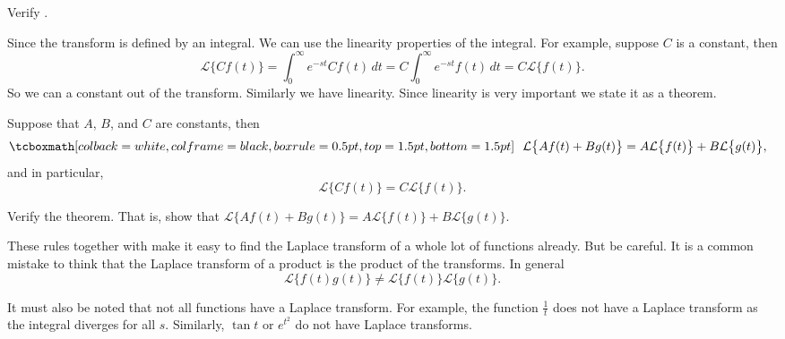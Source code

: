 \begin{exercise}
Verify .
\end{exercise}

Since the transform is defined by an integral.  We can use the linearity
properties of the integral.  For example, suppose $C$ is a constant, then
\begin{equation*}
\mathcal{L} \bigl\{ C f(t) \bigr\} =
\int_0^\infty e^{-st} C f(t) \,dt =
C \int_0^\infty e^{-st} f(t) \,dt =
C \mathcal{L} \bigl\{ f(t) \bigr\} .
\end{equation*}
So we can  a constant out of the transform.  Similarly  we have
linearity.
Since linearity is very important we state it as a theorem.

\begin{theorem}
Suppose that $A$, $B$, and $C$ are constants, then
\begin{equation*}
\mybxbg{~~
\mathcal{L} \bigl\{ A f(t) + B g(t) \bigr\} =
A \mathcal{L} \bigl\{ f(t) \bigr\} +
B \mathcal{L} \bigl\{ g(t) \bigr\} ,
~~}
\end{equation*}
and in particular,
\begin{equation*}
\mathcal{L} \bigl\{ C f(t) \bigr\} =
C \mathcal{L} \bigl\{ f(t) \bigr\} .
\end{equation*}
\end{theorem}

\begin{exercise}
Verify the theorem.  That is, show that
$\mathcal{L} \bigl\{ A f(t) + B g(t) \bigr\} =
A \mathcal{L} \bigl\{ f(t) \bigr\} +
B \mathcal{L} \bigl\{ g(t) \bigr\}$.
\end{exercise}

These rules together with  make it easy to find
the Laplace transform of a whole lot of functions already.
But be careful.
It is a common mistake to think that the Laplace transform of a product
is the product of the transforms.  In general 
\begin{equation*}
\mathcal{L} \bigl\{ f(t) g(t) \bigr\} \not=
\mathcal{L} \bigl\{ f(t) \bigr\}
\mathcal{L} \bigl\{ g(t) \bigr\} .
\end{equation*}

It must also be noted that not all functions have a Laplace transform.  For
example, the function $\frac{1}{t}$ does not have a Laplace transform as the
integral diverges for all $s$.  Similarly,
$\tan t$ or $e^{t^2}$ do not have Laplace transforms.


